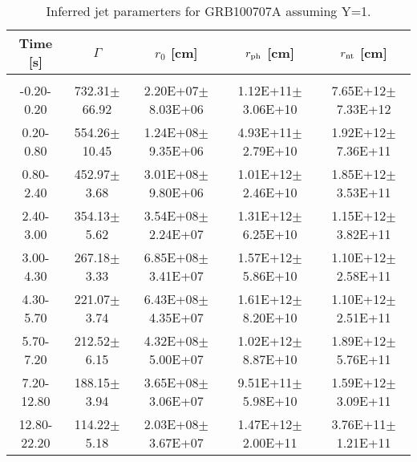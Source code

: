 \begin{table}[htp]
\scriptsize
\label{tab:}
\begin{tabular}{c c c c c}
Time [s] & $\Gamma$ & $r_0$ [cm] & $r_{\rm ph}$ [cm] & $r_{\rm nt}$ [cm] \\
\hline \hline\\ 

-0.20-0.20 & 732.31$\pm$66.92 & 2.20E+07$\pm$8.03E+06 & 1.12E+11$\pm$3.06E+10 & 7.65E+12$\pm$7.33E+12 \\ 

0.20-0.80 & 554.26$\pm$10.45 & 1.24E+08$\pm$9.35E+06 & 4.93E+11$\pm$2.79E+10 & 1.92E+12$\pm$7.36E+11 \\ 

0.80-2.40 & 452.97$\pm$3.68 & 3.01E+08$\pm$9.80E+06 & 1.01E+12$\pm$2.46E+10 & 1.85E+12$\pm$3.53E+11 \\ 

2.40-3.00 & 354.13$\pm$5.62 & 3.54E+08$\pm$2.24E+07 & 1.31E+12$\pm$6.25E+10 & 1.15E+12$\pm$3.82E+11 \\ 

3.00-4.30 & 267.18$\pm$3.33 & 6.85E+08$\pm$3.41E+07 & 1.57E+12$\pm$5.86E+10 & 1.10E+12$\pm$2.58E+11 \\ 

4.30-5.70 & 221.07$\pm$3.74 & 6.43E+08$\pm$4.35E+07 & 1.61E+12$\pm$8.20E+10 & 1.10E+12$\pm$2.51E+11 \\ 

5.70-7.20 & 212.52$\pm$6.15 & 4.32E+08$\pm$5.00E+07 & 1.02E+12$\pm$8.87E+10 & 1.89E+12$\pm$5.76E+11 \\ 

7.20-12.80 & 188.15$\pm$3.94 & 3.65E+08$\pm$3.06E+07 & 9.51E+11$\pm$5.98E+10 & 1.59E+12$\pm$3.09E+11 \\ 

12.80-22.20 & 114.22$\pm$5.18 & 2.03E+08$\pm$3.67E+07 & 1.47E+12$\pm$2.00E+11 & 3.76E+11$\pm$1.21E+11 \\ 

\end{tabular}
\caption{Inferred jet paramerters for GRB100707A assuming Y=1.}
\end{table}
